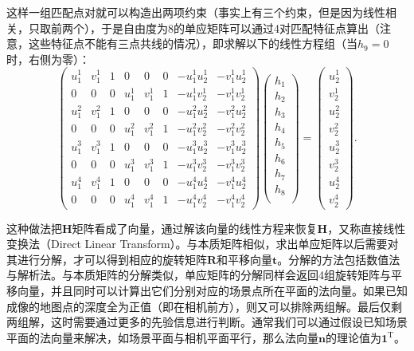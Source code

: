 这样一组匹配点对就可以构造出两项约束（事实上有三个约束，但是因为线性相关，只取前两个），于是自由度为8的单应矩阵可以通过4对匹配特征点算出（注意，这些特征点不能有三点共线的情况），即求解以下的线性方程组（当$h_9 = 0$时，右侧为零）：
\begin{equation}
\begin{pmatrix}
u_{1}^{1}& v_{1}^{1}& 1 & 0 & 0 & 0 & -u_{1}^{1}u_{2}^{1} & -v_{1}^{1}u_{2}^{1}\\
0 & 0 & 0& u_{1}^{1}& v_{1}^{1}& 1 &  -u_{1}^{1}v_{2}^{1} & -v_{1}^{1}v_{2}^{1}\\
u_{1}^{2}& v_{1}^{2}& 1 & 0 & 0 & 0 & -u_{1}^{2}u_{2}^{2} & -v_{1}^{2}u_{2}^{2}\\
0 & 0 & 0& u_{1}^{2}& v_{1}^{2}& 1 &  -u_{1}^{2}v_{2}^{2} & -v_{1}^{2}v_{2}^{2}\\
u_{1}^{3}& v_{1}^{3}& 1 & 0 & 0 & 0 & -u_{1}^{3}u_{2}^{3} & -v_{1}^{3}u_{2}^{3}\\
0 & 0 & 0& u_{1}^{3}& v_{1}^{3}& 1 &  -u_{1}^{3}v_{2}^{3} & -v_{1}^{3}v_{2}^{3}\\
u_{1}^{4}& v_{1}^{4}& 1 & 0 & 0 & 0 & -u_{1}^{4}u_{2}^{4} & -v_{1}^{4}u_{2}^{4}\\
0 & 0 & 0& u_{1}^{4}& v_{1}^{4}& 1 &  -u_{1}^{4}v_{2}^{4} & -v_{1}^{4}v_{2}^{4}
\end{pmatrix}
\begin{pmatrix}
 h_{1}\\h_{2}\\h_{3}\\ h_{4}\\h_{5}\\h_{6}\\ h_{7}\\h_{8}\\  
\end{pmatrix}
=
\begin{pmatrix}
u_{2}^{1}\\ v_{2}^{1}\\ u_{2}^{2}\\ v_{2}^{2}\\u_{2}^{3}\\ v_{2}^{3}\\u_{2}^{4}\\ v_{2}^{4}
\end{pmatrix}.
\end{equation}

这种做法把$\bm{H}$矩阵看成了向量，通过解该向量的线性方程来恢复$\bm{H}$，又称直接线性变换法（Direct Linear Transform）。与本质矩阵相似，求出单应矩阵以后需要对其进行分解，才可以得到相应的旋转矩阵$\bm{R}$和平移向量$\bm{t}$。分解的方法包括数值法\textsuperscript{\cite{faugeras1988motion, Zhang1996}}与解析法\textsuperscript{\cite{malis2007deeper}}。与本质矩阵的分解类似，单应矩阵的分解同样会返回4组旋转矩阵与平移向量，并且同时可以计算出它们分别对应的场景点所在平面的法向量。如果已知成像的地图点的深度全为正值（即在相机前方），则又可以排除两组解。最后仅剩两组解，这时需要通过更多的先验信息进行判断。通常我们可以通过假设已知场景平面的法向量来解决，如场景平面与相机平面平行，那么法向量$\bm{n}$的理论值为$\bm{1}^\mathrm{T}$。

